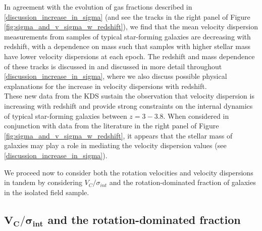 \documentclass[fleqn,usenatbib]{mnras}
\begin{document}
In agreement with the evolution of gas fractions described in \cref{discussion_increase_in_sigma} (and see the tracks in the right panel of Figure \ref{fig:sigma_and_v_sigma_w_redshift}), we find that the mean velocity dispersion measurements from samples of typical star-forming galaxies are decreasing with redshift, with a dependence on mass such that samples with higher stellar mass have lower velocity dispersions at each epoch.
The redshift and mass dependence of these tracks is discussed in \cite{Wisnioski2015} and discussed in more detail throughout \cref{discussion_increase_in_sigma}, where we also discuss possible physical explanations for the increase in velocity dispersions with redshift. \\  

\noindent
These new data from the KDS sustain the observation that velocity dispersion is increasing with redshift and provide strong constraints on the internal dynamics of typical star-forming galaxies between $z=3-3.8$.
When considered in conjunction with data from the literature in the right panel of Figure \ref{fig:sigma_and_v_sigma_w_redshift}, it appears that the stellar mass of galaxies may play a role in mediating the velocity dispersion values (see \cref{discussion_increase_in_sigma}).

We proceed now to consider both the rotation velocities and velocity dispersions in tandem by considering $V_{C}/\sigma_{int}$ and the rotation-dominated fraction of galaxies in the isolated field sample.

\subsection{$\boldsymbol{V_{C}/\sigma_{int}}$ and the rotation-dominated fraction}\label{subsec:rdf_v_over_sigma}
\end{document}
